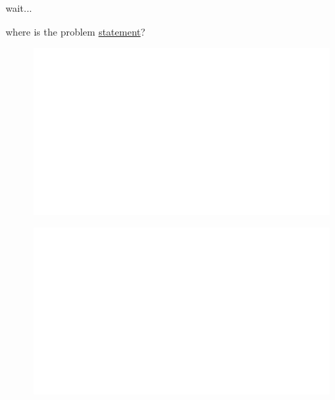 \noindent
wait... 


where is the problem \href{https://www.youtube.com/watch?v=dQw4w9WgXcQ}{statement}?

\begin{centering}
    \begin{figure}[h]
        \centering
        \includegraphics[width=\textwidth]{whyareyoucheckingthenameofthisfile.png}
    \end{figure}
\end{centering}

\begin{centering}
    \begin{figure}[h!]
        \centering
        \includegraphics[width=\textwidth]{whyareyoucheckingthenameofthisfile.png}
    \end{figure}
\end{centering}

